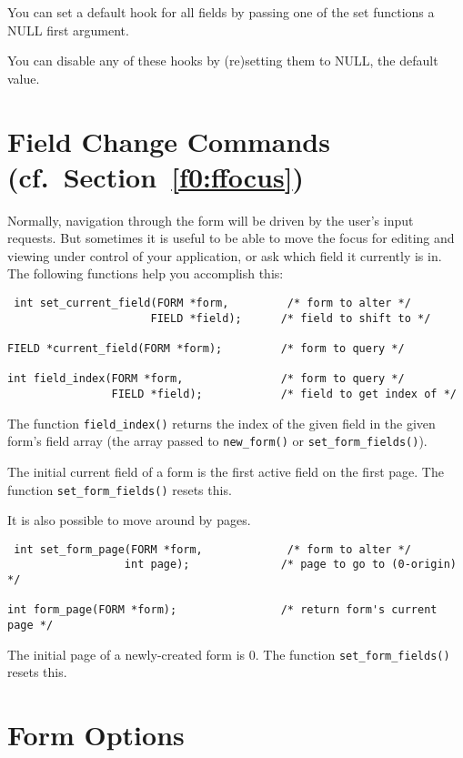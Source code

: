 You can set a default hook for all fields by passing one of the set functions
a NULL first argument. 

You can disable any of these hooks by (re)setting them to NULL, the default
value.

\section{Field Change Commands (cf.\ Section~\protect\ref{f0:ffocus})}

Normally, navigation through the form will be driven by the user's
input requests.  But sometimes it is useful to be able to move the
focus for editing and viewing under control of your application, or
ask which field it currently is in.  The following functions help you
accomplish this:
\begin{verbatim} int set_current_field(FORM *form,         /* form to alter */
                      FIELD *field);      /* field to shift to */

FIELD *current_field(FORM *form);         /* form to query */

int field_index(FORM *form,               /* form to query */
                FIELD *field);            /* field to get index of */
\end{verbatim}
The function \texttt{field\_index()} returns the index of the given field
in the given form's field array (the array passed to \texttt{new\_form()} or
\texttt{set\_form\_fields()}). 

The initial current field of a form is the first active field on the
first page. The function \texttt{set\_form\_fields()} resets this.

It is also possible to move around by pages.
\begin{verbatim} int set_form_page(FORM *form,             /* form to alter */
                  int page);              /* page to go to (0-origin) */

int form_page(FORM *form);                /* return form's current page */
\end{verbatim}
The initial page of a newly-created form is 0.  The function
\texttt{set\_form\_fields()} resets this.

\section{Form Options}


